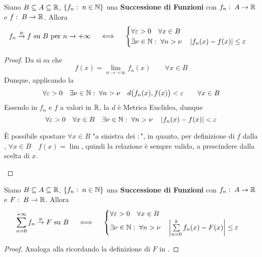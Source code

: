 \begin{proposition}
	\label{prop:conv_punt_lim_succ}
	Siano $B \subseteq A \subseteq \mathbb{R}$, $\left\{f_n:\; n \in \mathbb{N}\right\}$ una \textbf{Successione di Funzioni} con $f_n:\; A \to \mathbb{R}$ e $f:\; B \to \mathbb{R}$. Allora
	\[
		f_n \overset{\text{p}}{\to} f \text{ su } B \text{ per } n \to +\infty
		\quad \iff \quad
		\begin{cases}
			\forall \varepsilon > 0 \quad \forall x \in B\\
			\exists \nu \in \mathbb{N}:\; \forall n > \nu \quad \left|f_n(x) - f(x)\right| \leq \varepsilon
		\end{cases}
	\]
	\begin{proof}
		Da  si sa che
		\[f(x) = \lim\limits_{n \to +\infty} f_n(x) \qquad \forall x \in B\]
		Dunque, applicando la 
		\[
			\forall \varepsilon > 0 \quad \exists\nu\in\mathbb{N}:\; \forall n > \nu \quad d \bigl( f_n(x), f(x) \bigr) < \varepsilon  \qquad \forall x \in B
		\]
		Essendo in $f_n$ e $f$ a valori in $\mathbb{R}$, la $d$ è Metrica Euclidea, dunque
		\[
			\forall \varepsilon > 0 \quad \forall x \in B \quad \exists\nu\in\mathbb{N}:\; \forall n > \nu \quad \left|f_n(x) - f(x)\right| < \varepsilon
		\]
		\vspace*{-\baselineskip}
		\begin{note}
			È possibile spostare $\forall x \in B$ "a sinistra dei $:$", in quanto, per definizione di $f$ dalla , $\forall x \in B \quad f(x) = \lim$, quindi la relazione è sempre valida, a prescindere dalla scelta di $x$.
		\end{note}
	\end{proof}
\end{proposition}
\begin{proposition}
	Siano $B \subseteq A \subseteq \mathbb{R}$, $\left\{f_n:\; n \in \mathbb{N}\right\}$ una \textbf{Successione di Funzioni} con $f_n:\; A \to \mathbb{R}$ e $F:\; B \to \mathbb{R}$. Allora
	\[
		\sum\limits_{n = 0}^{+\infty} f_n \overset{\text{p}}{\to} F \text{ su } B
		\quad \iff \quad
		\begin{cases}
			\forall \varepsilon > 0 \quad \forall x \in B\\
			\exists \nu \in \mathbb{N}:\; \forall n > \nu \quad \left|\sum\limits_{n = 0}^{k} f_n(x) - F(x)\right| \leq \varepsilon
		\end{cases}
	\]
	\begin{proof}
		Analoga alla  ricordando la definizione di $F$ in .
	\end{proof}
\end{proposition}

